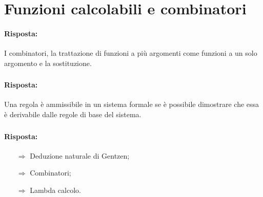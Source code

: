 \section{Funzioni calcolabili e combinatori}


\paragraph{Risposta:} I combinatori, la trattazione di funzioni a più argomenti
come funzioni a un solo argomento e la sostituzione.

\subsubsection{}


\paragraph{Risposta:} Una regola è ammissibile in un sistema formale se è possibile
dimostrare che essa è derivabile dalle regole di base del sistema.

\subsubsection{}


\paragraph{Risposta:}

\begin{itemize}
    \item [$\Rightarrow$] Deduzione naturale di Gentzen;
    \item [$\Rightarrow$] Combinatori;
    \item [$\Rightarrow$] Lambda calcolo.
\end{itemize}

\subsubsection{}

